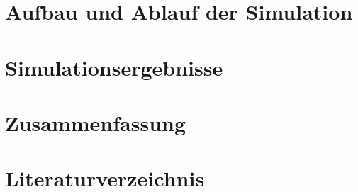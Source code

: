 \documentclass[10pt,a4paper,oneside]{article}
\begin{document}
\section{Aufbau und Ablauf der Simulation}\label{sec:durchführung}

\clearpage

\section{Simulationsergebnisse}\label{sec:resultate}

\clearpage

\section{Zusammenfassung}\label{sec:zusammenfassung}

\clearpage

\section{Literaturverzeichnis}\label{sec:literaturverzeichnis}

\clearpage
\end{document}
